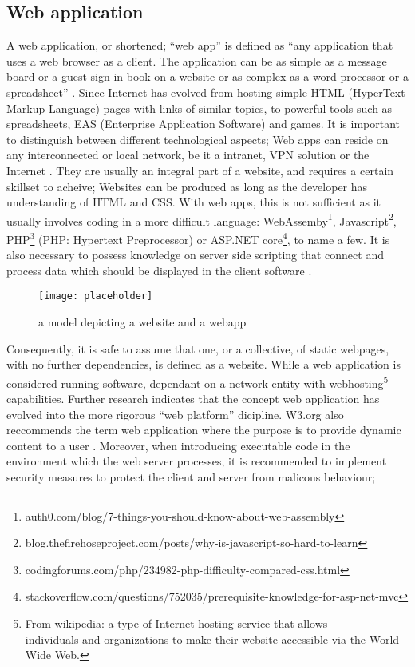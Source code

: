 \subsection{Web application}
A web application, or shortened; \enquote{web app} is defined as \enquote{any application that uses a web browser as a client. The application can be as simple as a message board or a guest sign-in book on a website or as complex as a word processor or a spreadsheet} \cite{nations2016understanding}.
Since Internet has evolved from hosting simple {\small HTML} {\small(HyperText Markup Language)} pages with links of similar topics, to powerful tools such as spreadsheets, {\small EAS} {\small(Enterprise Application Software)} and games. It is important to distinguish between different technological aspects; Web apps can reside on any interconnected or local network, be it a intranet, {\small VPN} solution or the Internet \cite{joan2011difference}.
They are usually an integral part of a website, and requires a certain skillset to acheive; Websites can be produced as long as the developer has understanding of {\small HTML} and {\small CSS}. With web apps, this is not sufficient as it usually involves coding in a more difficult language: WebAssemby\footnote{auth0.com/blog/7-things-you-should-know-about-web-assembly}, Javascript\footnote{blog.thefirehoseproject.com/posts/why-is-javascript-so-hard-to-learn}, {\small PHP}\footnote{codingforums.com/php/234982-php-difficulty-compared-css.html} {\small (PHP: Hypertext Preprocessor)} or {\small ASP.NET} core\footnote{stackoverflow.com/questions/752035/prerequisite-knowledge-for-asp-net-mvc}, to name a few. It is also necessary to possess knowledge on server side scripting that connect and process data which should be displayed in the client software \cite{joan2011difference}.

\begin{figure}[htp]
    \centering
    \texttt{[image: placeholder]}
    \caption{a model depicting a website and a webapp}
    \label{fig:literaturewebapp}
\end{figure}

Consequently, it is safe to assume that one, or a collective, of static webpages, with no further dependencies, is defined as a website. While a web application is considered running software, dependant on a network entity with webhosting\footnote{From wikipedia: a type of Internet hosting service that allows \\individuals and organizations to make their website accessible via the World Wide Web.} capabilities. Further research indicates that the concept web application has evolved into the more rigorous \enquote{web platform} dicipline. W3.org also reccommends the term web application where the purpose is to provide dynamic content to a user \cite{wwwc2016standards, wwwc2008webapplication}. Moreover, when introducing executable code in the environment which the web server processes, it is recommended to implement security measures to protect the client and server from malicous behaviour;

